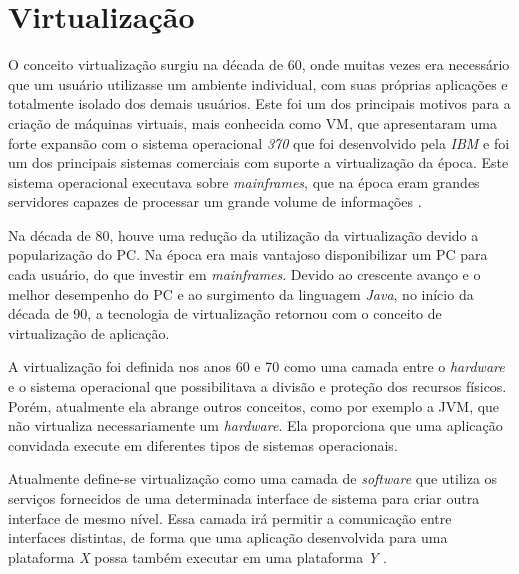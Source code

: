 \chapter{Virtualização}
\label{cap:virtualizacao}

O conceito virtualização surgiu na década de 60, onde muitas vezes era necessário que um usuário utilizasse um ambiente individual, 
com suas próprias aplicações e totalmente isolado dos demais usuários. Este foi um dos principais motivos para a criação de máquinas 
virtuais, mais conhecida como \ac{VM}, que apresentaram uma forte expansão com o sistema operacional \textit{370} que foi desenvolvido 
pela \textit{IBM} e foi um dos principais sistemas comerciais com suporte a virtualização da época. Este sistema operacional executava 
sobre \textit{mainframes}, que na época eram grandes servidores capazes de processar um grande volume de informações \cite{laureano2008}. 

Na década de 80, houve uma redução da utilização da virtualização devido a popularização do \ac{PC}. Na época era mais vantajoso disponibilizar 
um \ac{PC} para cada usuário, do que investir em \textit{mainframes}. Devido ao crescente avanço e o melhor desempenho do \ac{PC} e
ao surgimento da linguagem \textit{Java}, no início da década de 90, a tecnologia de virtualização retornou com o conceito de virtualização
de aplicação.

A virtualização foi definida nos anos 60 e 70 como uma camada entre o \textit{hardware} e o sistema operacional que possibilitava a 
divisão e proteção dos recursos físicos. Porém, atualmente ela abrange outros conceitos, como por exemplo a \ac{JVM}, que não virtualiza
necessariamente um \textit{hardware}. Ela proporciona que uma aplicação convidada execute em diferentes tipos de sistemas operacionais.

Atualmente define-se virtualização como uma camada de \textit{software} que utiliza os serviços fornecidos de uma determinada interface de 
sistema para criar outra interface de mesmo nível. Essa camada irá permitir a comunicação entre interfaces distintas, de forma que uma 
aplicação desenvolvida para uma plataforma \textit{X} possa também executar em uma plataforma \textit{Y} \cite{laureano2008}.

